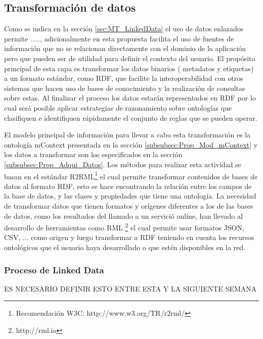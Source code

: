 \subsection{Transformación de datos}
\label{subsec:Prop_TransDatos}

Como se indica en la sección \ref{sec:MT_LinkedData} el uso de datos enlazados permite ....., adicionalmente en esta propuesta facilita el uso de fuentes de información que no se relacionan directamente con el dominio de la aplicación pero que pueden ser de utilidad para definir el contexto del usuario. El propósito principal de esta capa es transformar los datos binarios ( metadatos y etiquetas) a un formato estándar, como RDF, que facilite la interoperabilidad con otros sistemas que hacen uso de bases de conocimiento y la realización de consultas sobre estas. Al finalizar el proceso los datos estarán representados en RDF por lo cual será posible aplicar estrategias de razonamiento sobre ontologías que clasifiquen e identifiquen rápidamente el conjunto de reglas que se pueden operar.

El modelo principal de información para llevar a cabo esta transformación es la ontología mContext presentada en la sección \ref{subsubsec:Prop_Mod_mContext} y los datos a transformar son los especificados en la sección \ref{subsubsec:Prop_Adqui_Datos}. Los métodos para realizar esta actividad se basan en el estándar R2RML\footnote{Recomendación W3C: http://www.w3.org/TR/r2rml/} el cual permite transformar contenidos de bases de datos al formato RDF, esto se hace encontrando la relación entre los campos de la base de datos, y las clases y propiedades que tiene una ontología. La necesidad de transformar datos que tienen formatos y orígenes diferentes a los de las bases de datos, como los resultados del llamado a un servició onlíne, han llevado al desarrollo de herramientas como RML \footnote{http://rml.io} el cual permite usar formatos JSON, CSV, ... como origen y luego transformar a RDF teniendo en cuenta los recursos ontológicos que el usuario haya desarrollado o que estén disponibles en la red.






\subsubsection{Proceso de Linked Data}
\label{subsubsec:Prop_TransData_LD}
ES NECESARIO DEFINIR ESTO ENTRE ESTA Y LA SIGUIENTE SEMANA
